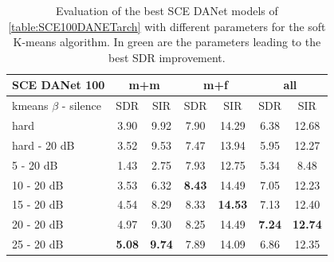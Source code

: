 \documentclass[master, tikz, final,11pt, dvipdfmx]{iscs-thesis}
\begin{document}
\begin{table}[h!]
\centering
\begin{tabular}{l|c|c|c|c|c|c}
SCE DANet 100 & \multicolumn{2}{c|}{m+m} & \multicolumn{2}{c|}{m+f} & \multicolumn{2}{c}{all} \\ 
\hline 
kmeans $\beta$ - silence & SDR & SIR & SDR & SIR & SDR & SIR \\ 
\hline
hard & 3.90 & 9.92 & 7.90 & 14.29 & 6.38 & 12.68 \\ 
hard - 20 dB  & 3.52 & 9.53 & 7.47 & 13.94 & 5.95 & 12.27 \\
\hline
\hline
5 - 20 dB  & 1.43 & 2.75 & 7.93 & 12.75 & 5.34 & 8.48 \\ 
10 - 20 dB  & 3.53 & 6.32 & \cellcolor{green}\textbf{8.43} & \cellcolor{green}14.49 & 7.05 & 12.23 \\ 
15 - 20 dB & 4.54 & 8.29 & 8.33 & \textbf{14.53} & 7.13 & 12.40 \\ 
20 - 20 dB & 4.97 & 9.30 & 8.25 & 14.49 & \cellcolor{green}\textbf{7.24} & \cellcolor{green}\textbf{12.74} \\ 
25 - 20 dB & \cellcolor{green}\textbf{5.08} & \cellcolor{green}\textbf{9.74} & 7.89 & 14.09 & 6.86 & 12.35 \\ 
\end{tabular}
\caption[Evaluation of the best SCE DANet models using spectrograms for different parameters for the soft K-means algorithm]{Evaluation of the best SCE DANet models of \autoref{table:SCE100DANETarch} with different parameters for the soft K-means algorithm. In green are the parameters leading to the best SDR improvement.}
\label{table:SCE100DANET}
\end{table}
\end{document}
